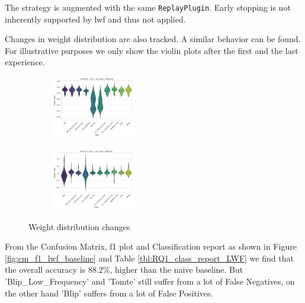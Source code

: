 The strategy is augmented with the same \verb|ReplayPlugin|. 
Early stopping is not inherently supported by \acrshort{lwf} and thus not applied. 

Changes in weight distribution are also tracked. A similar behavior can be found. For illustrative purposes we only show the violin plots after the first and the last experience. 

\begin{figure}[ht]
\centering
\begin{subfigure}
  \centering
  \includegraphics[width=0.4\textwidth]{Grad Assignment/Images/LwF_fusion_100epochs_exp_0.png}  
  \label{fig:lwf_violin_exp_0}
\end{subfigure}
\begin{subfigure}
  \centering
  \includegraphics[width=0.4\textwidth]{Grad Assignment/Images/LwF_fusion_100epochs_exp_4.png}  
  \label{fig:lwf_violin_exp_4}
\end{subfigure}
\caption{Weight distribution changes}
\label{fig:lwf_weight_distribution}
\end{figure}

From the Confusion Matrix, f1 plot and Classification report as shown in Figure \ref{fig:cm_f1_lwf_baseline} and Table \ref{tbl:RQ1_class_report_LWF} we find that the overall accuracy is $88.2 \%$, higher than the naive baseline. But 'Blip\_Low\_Frequency' and 'Tomte' still suffer from a lot of False Negatives, on the other hand 'Blip' suffers from a lot of False Positives. 

